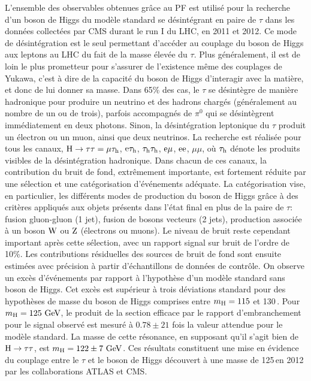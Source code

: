 L'ensemble des observables obtenues grâce au PF est utilisé pour la recherche d'un boson de Higgs du modèle standard se désintégrant en paire de $\tau$ dans les données collectées par CMS durant le run I du LHC, en 2011 et 2012. 
Ce mode de désintégration est le seul permettant d'accéder au couplage du boson de Higgs aux leptons au LHC du fait de la masse élevée du $\tau$. 
Plus généralement, il est de loin le plus prometteur pour s'assurer de l'existence même des couplages de Yukawa, 
c'est à dire de la capacité du boson de Higgs d'interagir avec la matière, et donc de lui donner sa masse. 
Dans 65\% des cas, le $\tau$ se désintègre de manière hadronique pour produire un neutrino et des hadrons chargés (généralement au nombre de un ou de trois), parfois accompagnés de $\pi^0$ qui se désintègrent immédiatement en deux photons. Sinon, la désintégration leptonique du $\tau$ produit un électron ou un muon, ainsi que deux neutrinos.
La recherche est réalisée pour tous les canaux, $\mathrm{H} \to \tau \tau = \mu \tau_{\textrm{h}}$, $\mathrm{e}\tau_{\textrm{h}}$, $\tau_{\textrm{h}} \tau_{\textrm{h}}$,  $\mathrm{e} \mu$, $\mathrm{e} \mathrm{e}$, $\mu \mu$, où $\tau_{\textrm{h}}$ dénote les produits visibles de la désintégration hadronique.
Dans chacun de ces canaux, la contribution du bruit de fond, extrêmement importante, est fortement réduite par une sélection et une catégorisation d'événements adéquate. 
La catégorisation vise, en particulier, les différents modes de production du boson de Higgs grâce à des critères appliqués aux objets présents dans l'état final en plus de la paire de $\tau$: fusion gluon-gluon (1 jet), fusion de bosons vecteurs (2 jets), production associée à un boson $\mathrm{W}$ ou $\mathrm{Z}$ (électrons ou muons).
Le niveau de bruit reste cependant important après cette sélection, avec un rapport signal sur bruit de l'ordre de 10\%. 
Les contributions résiduelles des sources de bruit de fond sont ensuite estimées avec précision à partir d'échantillons de données de contrôle. 
On observe un excès d'événements par rapport à l'hypothèse d'un modèle standard sans boson de Higgs. 
Cet excès est supérieur à trois déviations standard pour des hypothèses de masse du boson de Higgs comprises entre $m_{\rm H} = 115$ et 130\,\GeV. 
Pour $m_{\rm H} = 125\,\,\text{Ge\hspace{-.08em}V}$, le produit de la section efficace par le rapport d'embranchement pour le signal observé est mesuré à $0.78 \pm 21$ fois la valeur attendue pour le modèle standard. 
La masse de cette résonance, en supposant qu'il s'agit bien de $\mathrm{H} \to \tau \tau$, est $m_{\rm H} = 122 \pm 7\,\,\text{Ge\hspace{-.08em}V}$. 
Ces résultats constituent une mise en évidence du couplage entre le $\tau$ et le boson de Higgs découvert à une masse de 125\,\GeV en 2012 par les collaborations ATLAS et CMS. 
